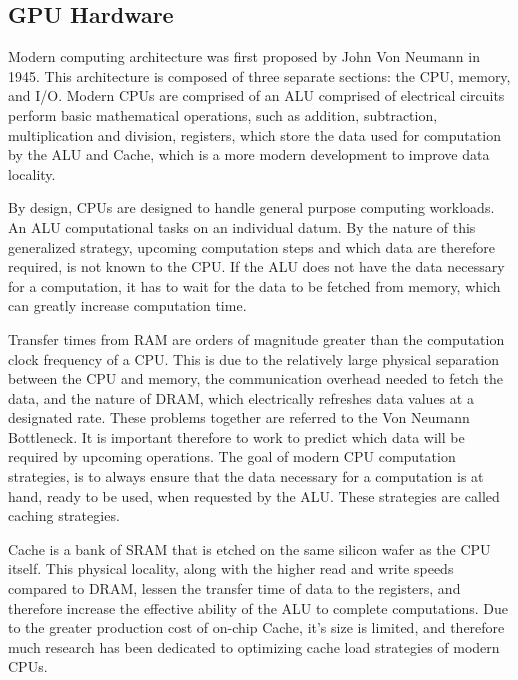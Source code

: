\subsection{GPU Hardware}

Modern computing architecture was first proposed by John Von Neumann in 1945.
This architecture is composed of three separate sections: the \Gls{CPU}, memory, and \Gls{I/O}.
Modern \Glspl{CPU} are comprised of an \Gls{ALU} comprised of electrical circuits
perform basic mathematical operations, such as addition, subtraction, multiplication and division,
registers, which store the data used for computation by the ALU and Cache, which is a more modern development to improve data locality.
\par
By design, \Glspl{CPU} are designed
to handle general purpose computing workloads.
An \Gls{ALU} computational
tasks on an individual datum. By the nature of this
generalized strategy, upcoming computation steps and which data are therefore required,
is not known to the CPU. If the ALU does not have the data necessary for a computation,
it has to wait for the data to be fetched from memory, which can greatly increase computation time.
\par
Transfer times from \Gls{RAM}
are orders of magnitude greater than the computation clock frequency of
a CPU.  This is due to the relatively large physical separation between the CPU and memory,
 the communication overhead needed to fetch the data, and
the nature of \Gls{DRAM}, which electrically refreshes data values at a designated rate.
These problems together are referred to the Von Neumann Bottleneck\cite{Backus}.
It is important therefore to work to predict which data will be required by upcoming operations.
The goal of modern CPU computation strategies, is to always ensure that the data
necessary for a computation is at hand, ready to be used, when requested by the \Gls{ALU}.
These strategies are called caching strategies.
\par
Cache is a bank of \Gls{SRAM}
that is etched on the same silicon wafer as the CPU itself.  This physical locality,
along with the higher read and write speeds compared to DRAM, lessen the transfer
time of data to the registers, and therefore increase the effective ability of the \Gls{ALU} to complete computations.
Due to the greater production cost of on-chip Cache, it's size is limited, and therefore
much research has been dedicated to optimizing cache load strategies of modern CPUs. %
\par

